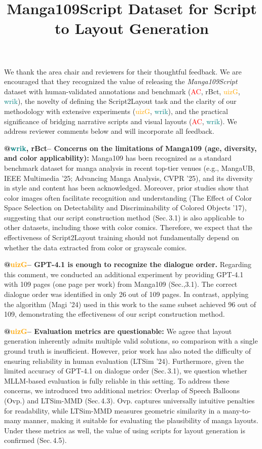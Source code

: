 \documentclass[10pt,twocolumn,letterpaper]{article}
\newcommand{\rBct}{\textcolor{wacvblue}{rBct}}
\newcommand{\uizG}{\textcolor{orange}{uizG}}
\newcommand{\wrik}{\textcolor{teal}{wrik}}
\newcommand{\AC}{\textcolor{red}{AC}}
\begin{document}
\title{Manga109Script Dataset for Script to Layout Generation }  %

\maketitle
\thispagestyle{empty}
\appendix


We thank the area chair and reviewers for their thoughtful feedback. 
We are encouraged that they recognized the value of releasing the \textit{Manga109Script} dataset with human-validated annotations and benchmark (\AC, \rBct, \uizG, \wrik), the novelty of defining the Script2Layout task and the clarity of our methodology with extensive experiments (\uizG, \wrik), and the practical significance of bridging narrative scripts and visual layouts (\AC, \wrik). We address reviewer comments below and will incorporate all feedback.

\noindent\textbf{@\wrik, \rBct – Concerns on the limitations of Manga109 (age, diversity, and color applicability):}
Manga109 has been recognized as a standard benchmark dataset for manga analysis in recent top-tier venues (e.g., MangaUB, IEEE Multimedia ’25; Advancing Manga Analysis, CVPR ’25), and its diversity in style and content has been acknowledged. Moreover, prior studies show that color images often facilitate recognition and understanding (The Effect of Color Space Selection on Detectability and Discriminability of Colored Objects ’17), suggesting that our script construction method (Sec.\,3.1) is also applicable to other datasets, including those with color comics. Therefore, we expect that the effectiveness of Script2Layout training should not fundamentally depend on whether the data extracted from color or grayscale comics.


\noindent\textbf{@\uizG – GPT-4.1 is enough to recognize the dialogue order.}
Regarding this comment, we conducted an additional experiment by providing GPT-4.1 with 109 pages (one page per work) from Manga109 (Sec.,3.1). The correct dialogue order was identified in only 26 out of 109 pages. In contrast, applying the algorithm (Magi ’24) used in this work to the same subset achieved 96 out of 109, demonstrating the effectiveness of our script construction method. 

\noindent\textbf{@\uizG – Evaluation metrics are questionable:}  
We agree that layout generation inherently admits multiple valid solutions, so comparison with a single ground truth is insufficient. However, prior work has also noted the difficulty of ensuring reliability in human evaluation (LTSim ’24). Furthermore, given the limited accuracy of GPT-4.1 on dialogue order (Sec.\,3.1), we question whether MLLM-based evaluation is fully reliable in this setting. To address these concerns, we introduced two additional metrics: Overlap of Speech Balloons (Ovp.) and LTSim-MMD (Sec.\,4.3). Ovp. captures universally intuitive penalties for readability, while LTSim-MMD measures geometric similarity in a many-to-many manner, making it suitable for evaluating the plausibility of manga layouts. Under these metrics as well, the value of using scripts for layout generation is confirmed (Sec.\,4.5).
\end{document}
